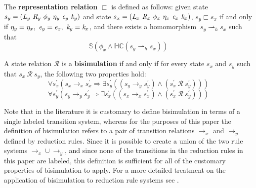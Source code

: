 \begin{definition}
\label{representation}
The \textbf{representation relation} $\sqsubset$ is defined as follows: given state $s_y = ( \emph{L}_y\ \emph{R}_y\ \phi_y\ \eta_y\ \emph{e}_y\ \emph{k}_y )$ and state $s_x = ( \cfgnt{L}_x\ \cfgnt{R}_x\ \phi_x\ \eta_x\ \cfgnt{e}_x\ \cfgnt{k}_x )$, $s_y \sqsubset s_x $ if and only if $\eta_y = \eta_x ,\ \emph{e}_y = \emph{e}_x ,\ \emph{k}_y = \emph{k}_x$, and there exists a homomorphism $\ s_y \rightharpoonup_{h} s_x $ such that 
\begin{equation}
\label{eqn:valid}
 \mathbb{S}( \phi_x \wedge \mathbb{HC}(s_y \rightharpoonup_{h} s_x) ) 
\end{equation}
\end{definition}

\begin{definition}
\label{bisimulation}
A state relation $\mathcal{R}$ is a \textbf{bisimulation} if and only if for every state $s_x$ and $s_y$ such that $s_x\ \mathcal{R}\ s_y$, the following two properties hold: 
\begin{equation}
\label{eqn:BisimulationForwards}
\forall s_x^\prime ( s_x \rightarrow_x s_x^\prime \Rightarrow \exists s_y^\prime( (s_y \rightarrow_y s_y^\prime )\wedge (s_x^\prime\ \mathcal{R}\ s_y^\prime ))  )
\end{equation}
\begin{equation}
\label{eqn:BisimulationBackwards}
\forall s_y^\prime ( s_y \rightarrow_y s_y^\prime\Rightarrow \exists s_x^\prime( (s_x \rightarrow_x s_x^\prime )\wedge (s_x^\prime\ \mathcal{R}\ s_y^\prime ))  )
\end{equation}
\end{definition}

Note that in the literature it is customary to define bisimulation in terms of a single labeled transition system, whereas for the purposes of this paper the definition of bisimulation refers to a pair of transition relations $\rightarrow_x$ and $\rightarrow_y$ defined by reduction rules. Since it is possible to create a union of the two rule systems $\rightarrow_x \cup \rightarrow_y$, and since none of the transitions in the reduction rules in this paper are labeled, this definition is sufficient for all of the customary properties of bisimulation to apply. For a more detailed treatment on the application of bisimulation to reduction rule systems see \cite{GSE:barbedbisimulation}.


